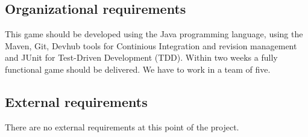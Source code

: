 \documentclass[a4paper]{article}
\begin{document}
\subsection{Organizational requirements}
This game should be developed using the Java programming language, using the Maven, Git, Devhub tools for Continious Integration and revision management and JUnit for Test-Driven Development (TDD). Within two weeks a fully functional game should be delivered. We have to work in a team of five.

\subsection{External requirements}
There are no external requirements at this point of the project.
\end{document}
